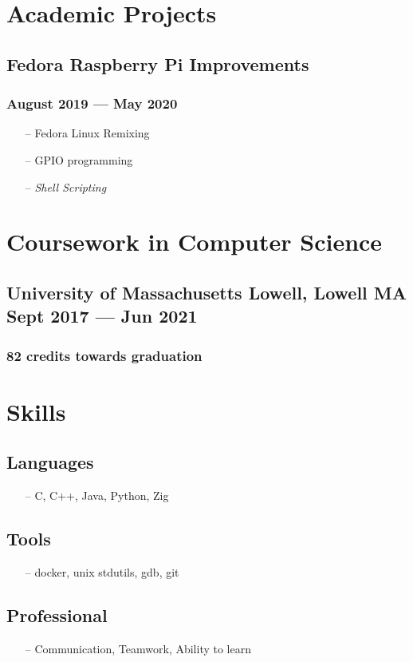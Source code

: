 \documentclass[11pt]{article}
\begin{document}
\section{Academic Projects}

\subsection{Fedora Raspberry Pi Improvements}
\subsubsection{August 2019 --- May 2020 }
\begin{itemize}[noitemsep, topsep=0pt]
	\item[--] Fedora Linux Remixing
	\item[--] GPIO programming
	\item[--] \emph{Shell Scripting}
\end{itemize}

\section{Coursework in Computer Science}
\subsection{University of Massachusetts Lowell, Lowell MA\\  Sept 2017 --- Jun 2021}
\subsubsection{82 credits towards graduation}
\noindent

\section{Skills}
\begin{multicols}{2}
	\subsection{Languages}
	\begin{itemize}[noitemsep, topsep=0pt]
		\item[--] C, C++, Java, Python, Zig
	\end{itemize}
	\subsection{Tools}
	\begin{itemize}[noitemsep, topsep=0pt]
		\item[--] docker, unix stdutils, gdb, git
	\end{itemize}
	\subsection{Professional}
	\begin{itemize}[noitemsep, topsep=0pt]
		\item[--] Communication, Teamwork, Ability to learn
	\end{itemize}
\end{multicols}
\end{document}
